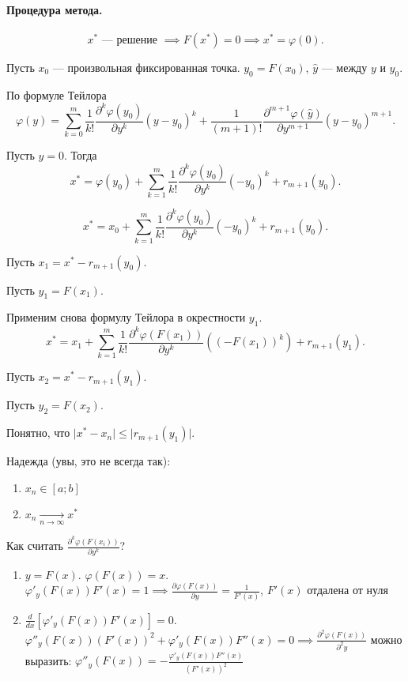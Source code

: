 \paragraph{Процедура метода.}
\[
	x^* \text{ --- решение } \implies F(x^*) = 0 \implies x^* = \varphi(0).
\]

Пусть $x_0$ --- произвольная фиксированная точка. $y_0 = F(x_0)$, $\hat{y}$ --- между $y$ и $y_0$.

По формуле Тейлора
\[
	\varphi(y) = \sum\limits_{k = 0}^m \frac{1}{k!} \frac{\partial^k \varphi(y_0)}{\partial y^k} (y-y_0)^k + \frac{1}{(m+1)!}\frac{\partial^{m+1}\varphi(\hat{y})}{\partial y^{m+1}}(y-y_0)^{m+1}.
\]

Пусть $y=0$. Тогда
\[
	x^* = \varphi(y_0) + \sum\limits_{k = 1}^m \frac{1}{k!} \frac{\partial^k \varphi(y_0)}{\partial y^k}(-y_0)^k + r_{m+1}(y_0).
\]

\[
	x^* = x_0 + \sum\limits_{k = 1}^m \frac{1}{k!} \frac{\partial^k \varphi(y_0)}{\partial y^k}(-y_0)^k + r_{m+1}(y_0).
\]

Пусть $x_1 = x^* - r_{m+1}(y_0)$.

Пусть $y_1 = F(x_1)$.

Применим снова формулу Тейлора в окрестности $y_1$.
\[
	x^* = x_1 + \sum\limits_{k=1}^m \frac{1}{k!}\frac{\partial^k\varphi(F(x_1))}{\partial y^k}((-F(x_1))^k) + r_{m+1}(y_1).
\]

Пусть $x_2 = x^* - r_{m+1}(y_1)$.

Пусть $y_2 = F(x_2)$.

Понятно, что $\vert x^* - x_{n}\vert \leq \vert r_{m+1}(y_1) \vert$.


Надежда (увы, это не всегда так):
\begin{enumerate}
	\item $x_n \in [a; b]$
	\item $x_n \underset{n \to \infty}{\longrightarrow} x^*$
\end{enumerate}

Как считать $\frac{\partial^k \varphi(F(x_i))}{\partial y^k}$?
\begin{enumerate}
	\item $y=F(x)$. $\varphi(F(x)) = x$. $\varphi'_y (F(x))F'(x) = 1 \implies \frac{\partial \varphi (F(x))}{\partial y} = \frac{1}{F'(x)}$, $F'(x)$ отдалена от нуля
	\item $\frac{d}{dx}[\varphi'_y (F(x))F'(x)] = 0$. $\varphi''_y (F(x))(F'(x))^2 + \varphi'_y (F(x))F''(x) = 0 \implies \frac {\partial^2 \varphi(F(x))}{\partial^2 y}$ можно выразить: $\varphi''_y (F(x)) = - \frac {\varphi'_y(F(x))F''(x)}{(F'(x))^2}$
\end{enumerate}


